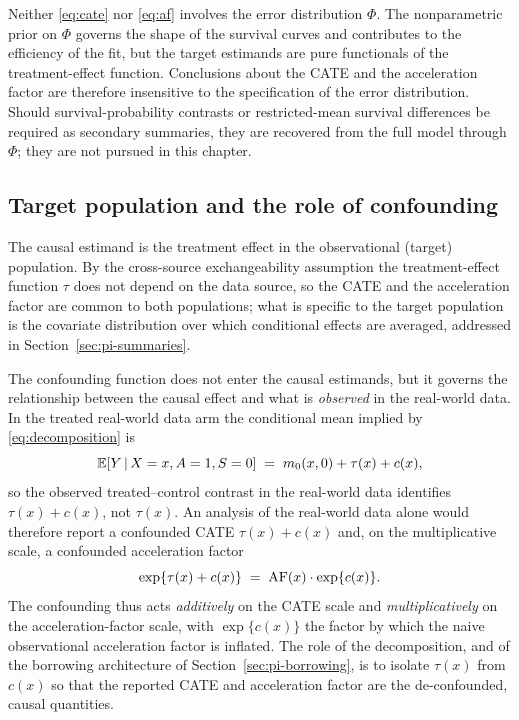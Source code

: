 \begin{remark}
\label{rem:phi-free}
Neither \eqref{eq:cate} nor \eqref{eq:af} involves the error distribution
$\Phi$. The nonparametric prior on $\Phi$ governs the shape of the survival
curves and contributes to the efficiency of the fit, but the target estimands
are pure functionals of the treatment-effect function. Conclusions about the
CATE and the acceleration factor are therefore insensitive to the specification
of the error distribution. Should survival-probability contrasts or
restricted-mean survival differences be required as secondary summaries, they
are recovered from the full model through $\Phi$; they are not pursued in this
chapter.
\end{remark}

\subsection{Target population and the role of confounding}
\label{subsec:target-pop}

The causal estimand is the treatment effect in the observational (target)
population. By the cross-source exchangeability assumption the treatment-effect
function $\tau$ does not depend on the data source, so the CATE and the
acceleration factor are common to both populations; what is specific to the
target population is the covariate distribution over which conditional effects
are averaged, addressed in Section~\ref{sec:pi-summaries}.

The confounding function does not enter the causal estimands, but it governs
the relationship between the causal effect and what is \emph{observed} in the
real-world data. In the treated real-world data arm the conditional mean
implied by \eqref{eq:decomposition} is
\[
\mathbb{E}[Y \,\vert\, X = x, A = 1, S = 0] \;=\; m_0(x, 0) + \tau(x) + c(x),
\]
so the observed treated--control contrast in the real-world data identifies
$\tau(x) + c(x)$, not $\tau(x)$. An analysis of the real-world data alone
would therefore report a confounded CATE $\tau(x) + c(x)$ and, on the
multiplicative scale, a confounded acceleration factor
\[
\exp\{\tau(x) + c(x)\} \;=\; \mathrm{AF}(x)\cdot\exp\{c(x)\}.
\]
The confounding thus acts \emph{additively} on the CATE scale and
\emph{multiplicatively} on the acceleration-factor scale, with $\exp\{c(x)\}$
the factor by which the naive observational acceleration factor is inflated. The
role of the decomposition, and of the borrowing architecture of
Section~\ref{sec:pi-borrowing}, is to isolate $\tau(x)$ from $c(x)$ so that the
reported CATE and acceleration factor are the de-confounded, causal quantities.

